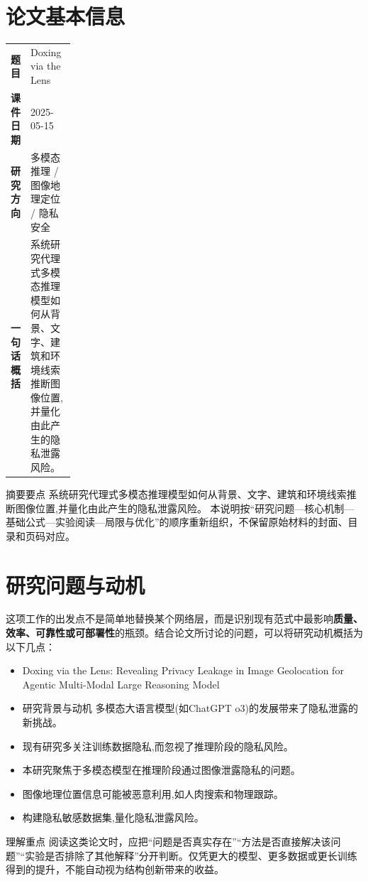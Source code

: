 \documentclass[UTF8,11pt,a4paper]{ctexart}
\newcommand{\term}[1]{\textbf{\textcolor{mainblue}{#1}}}
\begin{document}
\section{论文基本信息}
\begin{center}
\begin{tabularx}{0.94\linewidth}{>{\bfseries}p{0.18\linewidth}X}
\toprule
题目 & Doxing via the Lens\\
课件日期 & 2025-05-15\\
研究方向 & 多模态推理 / 图像地理定位 / 隐私安全\\
一句话概括 & 系统研究代理式多模态推理模型如何从背景、文字、建筑和环境线索推断图像位置,并量化由此产生的隐私泄露风险。\\
\bottomrule
\end{tabularx}
\end{center}

\begin{infobox}{摘要要点}
系统研究代理式多模态推理模型如何从背景、文字、建筑和环境线索推断图像位置,并量化由此产生的隐私泄露风险。 本说明按“研究问题—核心机制—基础公式—实验阅读—局限与优化”的顺序重新组织，不保留原始材料的封面、目录和页码对应。
\end{infobox}

\section{研究问题与动机}
这项工作的出发点不是简单地替换某个网络层，而是识别现有范式中最影响\term{质量、效率、可靠性或可部署性}的瓶颈。结合论文所讨论的问题，可以将研究动机概括为以下几点：
\begin{itemize}
\item Doxing via the Lens: Revealing Privacy Leakage in Image Geolocation for Agentic Multi-Modal Large Reasoning Model
\item 研究背景与动机 多模态大语言模型(如ChatGPT o3)的发展带来了隐私泄露的新挑战。
\item 现有研究多关注训练数据隐私,而忽视了推理阶段的隐私风险。
\item 本研究聚焦于多模态模型在推理阶段通过图像泄露隐私的问题。
\item 图像地理位置信息可能被恶意利用,如人肉搜索和物理跟踪。
\item 构建隐私敏感数据集,量化隐私泄露风险。
\end{itemize}

\begin{notebox}{理解重点}
阅读这类论文时，应把“问题是否真实存在”“方法是否直接解决该问题”“实验是否排除了其他解释”分开判断。仅凭更大的模型、更多数据或更长训练得到的提升，不能自动视为结构创新带来的收益。
\end{notebox}
\end{document}
